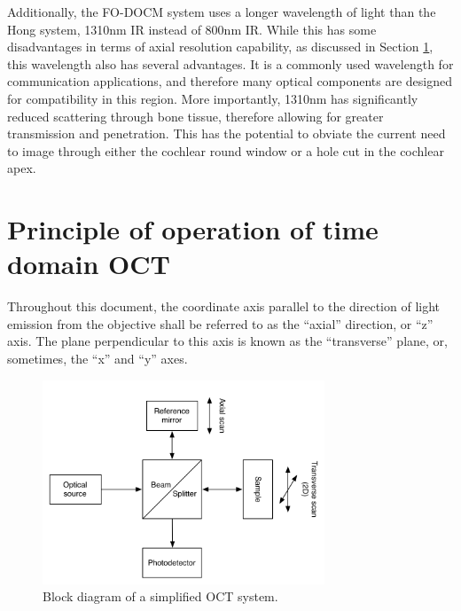 Additionally, the FO-DOCM system uses a longer wavelength of light than the Hong system, 1310nm IR instead of 800nm IR. While this has some disadvantages in terms of axial resolution capability, as discussed in Section \ref{sec:principles_oct}, this wavelength also has several advantages. It is a commonly used wavelength for communication applications, and therefore many optical components are designed for compatibility in this region. More importantly, 1310nm has significantly reduced scattering through bone tissue, therefore allowing for greater transmission and penetration. This has the potential to obviate the current need to image through either the cochlear round window or a hole cut in the cochlear apex. \cite{Sandell2011} \cite{Bashkatov2006}

\section{Principle of operation of time domain OCT}
\label{sec:principles_oct}


Throughout this document, the coordinate axis parallel to the direction of light emission from the objective shall be referred to as the ``axial'' direction, or ``z'' axis. The plane perpendicular to this axis is known as the ``transverse'' plane, or, sometimes, the ``x'' and ``y'' axes. %

\begin{figure}[h!]
  \centering
    \includegraphics[width=0.75\textwidth]{Images/Background/basic_oct_2.png}
      \caption{Block diagram of a simplified OCT system.\label{fig:basic_oct}}
\end{figure}

